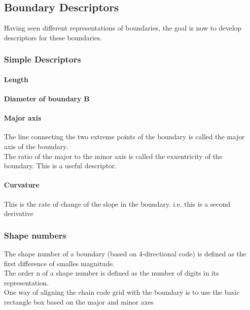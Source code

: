 \subsection{Boundary Descriptors}
\label{sec:boundaryDescriptors}
Having seen different representations of boundaries, the goal is now to develop descriptors for these boundaries.
\subsubsection{Simple Descriptors}
\paragraph{Length}
\paragraph{Diameter of boundary B}
\paragraph{Major axis}
The line connecting the two extreme points of the boundary is called the major axis of the boundary.\\
The ratio of the major to the minor axis is called the exxentricity of the boundary. This is a useful descriptor.
\paragraph{Curvature}
This is the rate of change of the slope in the boundary. i.e. this is a second derivative
\subsubsection{Shape numbers}
The shape number of a boundary (based on 4-directional code) is defined as the first difference of smalles magnitude.\\
The order n of a shape number is defined as the number of digits in its representation.\\
One way of aligning the chain code grid with the boundary is to use the basic rectangle box based on the major and minor axes\\
